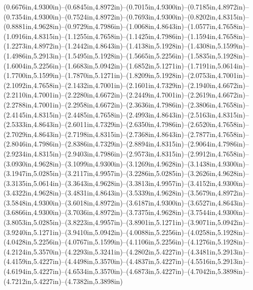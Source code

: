 (0.6676in,4.9300in)--(0.6845in,4.8972in)--(0.7015in,4.9300in)--(0.7185in,4.8972in)--(0.7354in,4.9300in)--(0.7524in,4.8972in)--(0.7693in,4.9300in)--(0.8202in,4.8315in)--(0.8881in,4.9628in)--(0.9729in,4.7986in)--(1.0068in,4.8643in)--(1.0577in,4.7658in)--(1.0916in,4.8315in)--(1.1255in,4.7658in)--(1.1425in,4.7986in)--(1.1594in,4.7658in)--(1.2273in,4.8972in)--(1.2442in,4.8643in)--(1.4138in,5.1928in)--(1.4308in,5.1599in)--(1.4986in,5.2913in)--(1.5495in,5.1928in)--(1.5665in,5.2256in)--(1.5835in,5.1928in)--(1.6004in,5.2256in)--(1.6683in,5.0942in)--(1.6852in,5.1271in)--(1.7191in,5.0614in)--(1.7700in,5.1599in)--(1.7870in,5.1271in)--(1.8209in,5.1928in)--(2.0753in,4.7001in)--(2.1092in,4.7658in)--(2.1432in,4.7001in)--(2.1601in,4.7329in)--(2.1940in,4.6672in)--(2.2110in,4.7001in)--(2.2280in,4.6672in)--(2.2449in,4.7001in)--(2.2619in,4.6672in)--(2.2788in,4.7001in)--(2.2958in,4.6672in)--(2.3636in,4.7986in)--(2.3806in,4.7658in)--(2.4145in,4.8315in)--(2.4485in,4.7658in)--(2.4993in,4.8643in)--(2.5163in,4.8315in)--(2.5333in,4.8643in)--(2.6011in,4.7329in)--(2.6350in,4.7986in)--(2.6520in,4.7658in)--(2.7029in,4.8643in)--(2.7198in,4.8315in)--(2.7368in,4.8643in)--(2.7877in,4.7658in)--(2.8046in,4.7986in)--(2.8386in,4.7329in)--(2.8894in,4.8315in)--(2.9064in,4.7986in)--(2.9234in,4.8315in)--(2.9403in,4.7986in)--(2.9573in,4.8315in)--(2.9912in,4.7658in)--(3.0930in,4.9628in)--(3.1099in,4.9300in)--(3.1269in,4.9628in)--(3.1438in,4.9300in)--(3.1947in,5.0285in)--(3.2117in,4.9957in)--(3.2286in,5.0285in)--(3.2626in,4.9628in)--(3.3135in,5.0614in)--(3.3643in,4.9628in)--(3.3813in,4.9957in)--(3.4152in,4.9300in)--(3.4322in,4.9628in)--(3.4831in,4.8643in)--(3.5339in,4.9628in)--(3.5679in,4.8972in)--(3.5848in,4.9300in)--(3.6018in,4.8972in)--(3.6187in,4.9300in)--(3.6527in,4.8643in)--(3.6866in,4.9300in)--(3.7036in,4.8972in)--(3.7375in,4.9628in)--(3.7544in,4.9300in)--(3.8053in,5.0285in)--(3.8223in,4.9957in)--(3.8901in,5.1271in)--(3.9071in,5.0942in)--(3.9240in,5.1271in)--(3.9410in,5.0942in)--(4.0088in,5.2256in)--(4.0258in,5.1928in)--(4.0428in,5.2256in)--(4.0767in,5.1599in)--(4.1106in,5.2256in)--(4.1276in,5.1928in)--(4.2124in,5.3570in)--(4.2293in,5.3241in)--(4.2802in,5.4227in)--(4.3481in,5.2913in)--(4.4159in,5.4227in)--(4.4498in,5.3570in)--(4.4837in,5.4227in)--(4.5516in,5.2913in)--(4.6194in,5.4227in)--(4.6534in,5.3570in)--(4.6873in,5.4227in)--(4.7042in,5.3898in)--(4.7212in,5.4227in)--(4.7382in,5.3898in) 